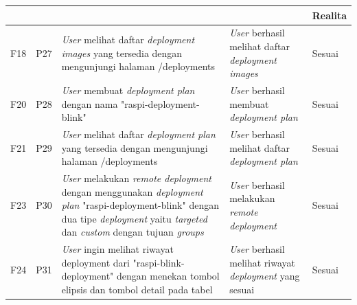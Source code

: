 \bgroup
\begin{table}[ht]
  \def\arraystretch{1.3}
  \centering
  \begin{tabular}{|p{2cm}|p{2cm}|p{4cm}|p{3cm}|p{2cm}|}
    \hline
    \centering{ID Fungsional} & \centering{ID Pengujian} & \centering{Skenario}                                                                                                                                                                                                                  & \centering{Ekspektasi}                                                 & Realita \\
    \hline

    F18                       & P27                      & \textit{User} melihat daftar \textit{deployment images} yang tersedia dengan mengunjungi halaman /deployments                                                                                                                         & \textit{User} berhasil melihat daftar \textit{deployment images}       & Sesuai  \\
    \hline
    F20                       & P28                      & \textit{User} membuat \textit{deployment plan} dengan nama "raspi-deployment-blink"                                                                                                                                                   & \textit{User} berhasil membuat \textit{deployment plan}                & Sesuai  \\
    \hline
    F21                       & P29                      & \textit{User} melihat daftar \textit{deployment plan} yang tersedia dengan mengunjungi halaman /deployments                                                                                                                           & \textit{User} berhasil melihat daftar \textit{deployment plan}         & Sesuai  \\
    \hline
    F23                       & P30                      & \textit{User} melakukan \textit{remote deployment} dengan menggunakan \textit{deployment plan} "raspi-deployment-blink" dengan dua tipe \textit{deployment} yaitu \textit{targeted} dan \textit{custom} dengan tujuan \textit{groups} & \textit{User} berhasil melakukan \textit{remote deployment}            & Sesuai  \\
    \hline
    F24                       & P31                      & \textit{User} ingin melihat riwayat deployment dari "raspi-blink-deployment"                                                               dengan menekan tombol elipsis dan tombol detail pada tabel                                 & \textit{User} berhasil melihat riwayat \textit{deployment} yang sesuai & Sesuai  \\
    \hline
  \end{tabular}
\end{table}
\egroup